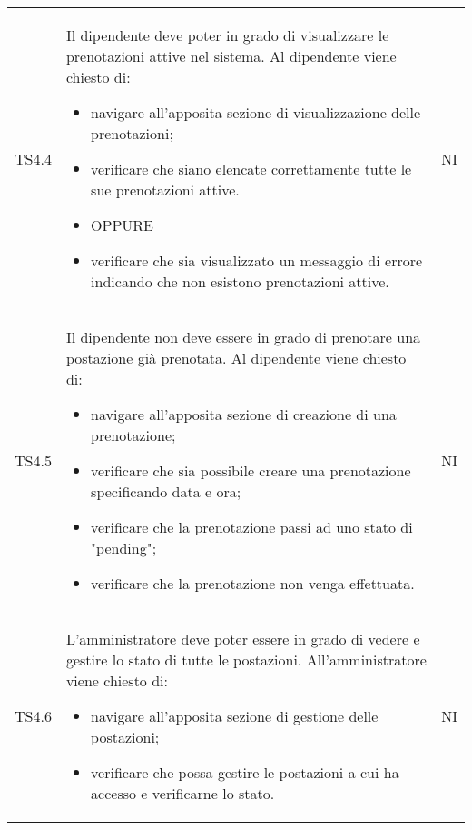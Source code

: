 {\begin{longtable}{ c C{11cm} c }
        TS4.4&
        \begin{flushleft}
            Il dipendente deve poter in grado di visualizzare le prenotazioni attive nel sistema.
            Al dipendente viene chiesto di:
        \end{flushleft}
        \begin{itemize}
            \item navigare all'apposita sezione di visualizzazione delle prenotazioni;
            \item verificare che siano elencate correttamente tutte le sue prenotazioni attive.
            \item [] OPPURE
            \item verificare che sia visualizzato un messaggio di errore indicando che non esistono prenotazioni attive.
        \end{itemize}&
        NI\\

        TS4.5&
        \begin{flushleft}
            Il dipendente non deve essere in grado di prenotare una postazione già prenotata.
            Al dipendente viene chiesto di:
        \end{flushleft}
        \begin{itemize}
            \item navigare all'apposita sezione di creazione di una prenotazione;
            \item verificare che sia possibile creare una prenotazione specificando data e ora;
            \item verificare che la prenotazione passi ad uno stato di "pending";
            \item verificare che la prenotazione non venga effettuata.
        \end{itemize}&
        NI\\

        TS4.6&
        \begin{flushleft}
            L'amministratore deve poter essere in grado di vedere e gestire lo stato di tutte le postazioni.
            All'amministratore viene chiesto di:
        \end{flushleft}
        \begin{itemize}
            \item navigare all'apposita sezione di gestione delle postazioni;
            \item verificare che possa gestire le postazioni a cui ha accesso e verificarne lo stato.
        \end{itemize}&
        NI\\


\end{longtable}}
